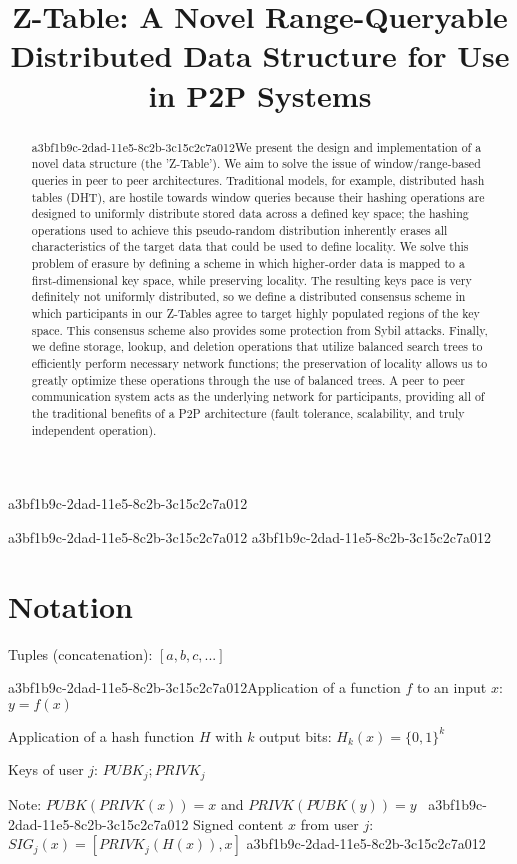 \documentclass[12pt]{article}
\title{Z-Table: A Novel Range-Queryable Distributed Data Structure for Use in P2P Systems}
\begin{document}
\maketitle
a3bf1b9c-2dad-11e5-8c2b-3c15c2c7a012
\begin{abstract}
a3bf1b9c-2dad-11e5-8c2b-3c15c2c7a012We present the design and implementation of a novel data structure (the 'Z-Table'). We aim to solve the issue of window/range-based queries in peer to peer architectures. Traditional models, for example,  distributed hash tables (DHT), are hostile towards window queries because their hashing operations are designed to uniformly distribute stored data across a defined key space; the hashing operations used to achieve this pseudo-random distribution inherently erases all characteristics of the target data that could be used to define locality. We solve this problem of erasure by defining a scheme in which higher-order data is mapped to a first-dimensional key space, while preserving locality. The resulting keys pace is very definitely not uniformly distributed, so we define a distributed consensus scheme in which participants in our Z-Tables agree to target highly populated regions of the key space. This consensus scheme also provides some protection from Sybil attacks. Finally, we define storage, lookup, and deletion operations that utilize balanced search trees to efficiently perform necessary network functions; the preservation of locality allows us to greatly optimize these operations through the use of balanced trees. A peer to peer communication system acts as the underlying network for participants, providing all of the traditional benefits of a P2P architecture (fault tolerance, scalability, and truly independent operation).
\end{abstract}
a3bf1b9c-2dad-11e5-8c2b-3c15c2c7a012
a3bf1b9c-2dad-11e5-8c2b-3c15c2c7a012\section{Notation}

Tuples (concatenation): $[a,b,c,...]$

a3bf1b9c-2dad-11e5-8c2b-3c15c2c7a012Application of a function $f$ to an input $x$: $y=f(x)$

Application of a hash function $H$ with $k$ output bits: $H_{k}(x) = \{0,1\}^k$

Keys of user $j$: $ PUBK_j; PRIVK_j $

Note: $PUBK(PRIVK(x)) = x$ and $PRIVK(PUBK(y)) = y$~
a3bf1b9c-2dad-11e5-8c2b-3c15c2c7a012
Signed content $x$ from user $j$: $SIG_j(x) = \left[ PRIVK_j( H(x) ), x \right]$
a3bf1b9c-2dad-11e5-8c2b-3c15c2c7a012
\end{document}

